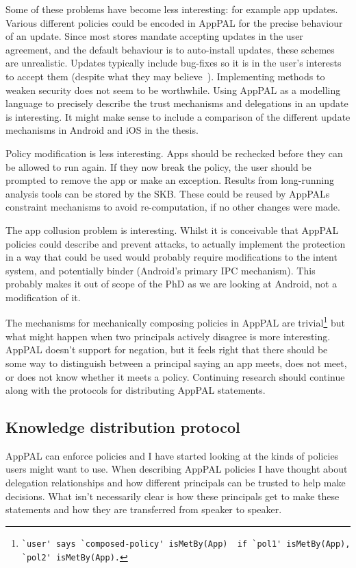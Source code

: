 \documentclass[a4paper]{scrartcl}
\begin{document}
Some of these problems have become less interesting: for example app updates.
Various different policies could be encoded in AppPAL for the precise behaviour of an update.
Since most stores mandate accepting updates in the user agreement, and the default behaviour is to auto-install updates, these schemes are unrealistic.
Updates typically include bug-fixes so it is in the user's interests to accept them (despite what they may believe~\citep{Vaniea:2014fk}).
Implementing methods to weaken security does not seem to be worthwhile.
Using AppPAL as a modelling language to precisely describe the trust mechanisms and delegations in an update is interesting.
It might make sense to include a comparison of the different update mechanisms in Android and iOS in the thesis.

Policy modification is less interesting.
Apps should be rechecked before they can be allowed to run again.
If they now break the policy, the user should be prompted to remove the app or make an exception.
Results from long-running analysis tools can be stored by the \ac{SKB}.
These could be reused by AppPALs constraint mechanisms to avoid re-computation, if no other changes were made.

The app collusion problem is interesting.
Whilst it is conceivable that AppPAL policies could describe and prevent attacks, to actually implement the protection in a way that could be used would probably require modifications to the intent system, and potentially binder (Android's primary IPC mechanism).
This probably makes it out of scope of the PhD as we are looking at Android, not a modification of it.

The mechanisms for mechanically composing policies in AppPAL are trivial\footnote{\lstinline{`user' says `composed-policy' isMetBy(App)  if `pol1' isMetBy(App), `pol2' isMetBy(App).}} but what might happen when two principals actively disagree is more interesting.
AppPAL doesn't support for negation, but it feels right that there should be some way to distinguish between a principal saying an app meets, does not meet, or does not know whether it meets a policy.
Continuing research should continue along with the protocols for distributing AppPAL statements.

\subsection{Knowledge distribution protocol}
\label{ssec:kdp}

AppPAL can enforce policies and I have started looking at the kinds of policies users might want to use.
When describing AppPAL policies I have thought about delegation relationships and how different principals can be trusted to help make decisions.
What isn't necessarily clear is how these principals get to make these statements and how they are transferred from speaker to speaker.
\end{document}
